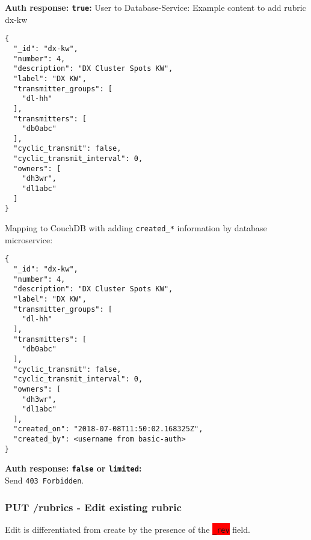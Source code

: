 \textbf{Auth response: \texttt{true}:}
User to Database-Service: Example content to add rubric dx-kw
\begin{lstlisting}
{
  "_id": "dx-kw",
  "number": 4,
  "description": "DX Cluster Spots KW",
  "label": "DX KW",
  "transmitter_groups": [
    "dl-hh"
  ],
  "transmitters": [
    "db0abc"
  ],
  "cyclic_transmit": false,
  "cyclic_transmit_interval": 0,
  "owners": [
    "dh3wr",
    "dl1abc"
  ]
}
\end{lstlisting}

Mapping to CouchDB with adding \verb|created_*| information by database microservice:\\
\begin{lstlisting}
{
  "_id": "dx-kw",
  "number": 4,
  "description": "DX Cluster Spots KW",
  "label": "DX KW",
  "transmitter_groups": [
    "dl-hh"
  ],
  "transmitters": [
    "db0abc"
  ],
  "cyclic_transmit": false,
  "cyclic_transmit_interval": 0,
  "owners": [
    "dh3wr",
    "dl1abc"
  ],
  "created_on": "2018-07-08T11:50:02.168325Z",
  "created_by": <username from basic-auth>
}
\end{lstlisting}

\textbf{Auth response: \texttt{false} or \texttt{limited}:}\\
Send \verb|403 Forbidden|.

\subsubsection{PUT /rubrics - Edit existing rubric}
\label{protocoldef:microservicesapi:database:putrubrics/rubrics_update}
Edit is differentiated from create by the presence of the \colorbox{red}{\texttt{\_rev}} field.

